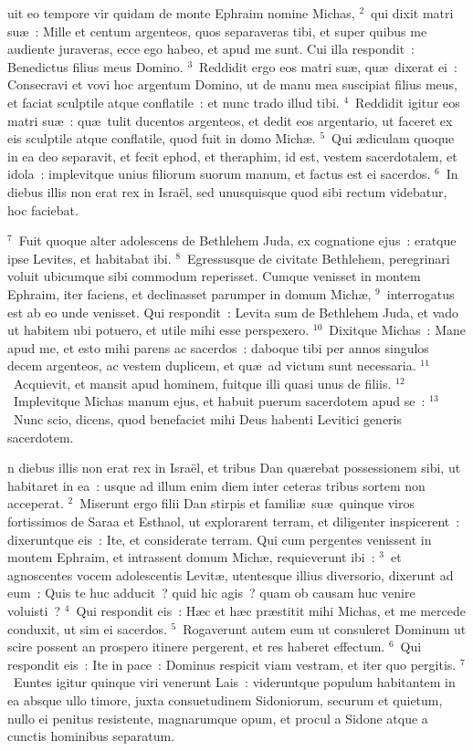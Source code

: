 \bchapter
{}uit eo tempore vir quidam de monte Ephraim nomine Michas,
${}^{2}$~qui dixit matri su\ae~: Mille et centum argenteos, quos separaveras tibi, et super quibus me audiente juraveras, ecce ego habeo, et apud me sunt. Cui illa respondit~: Benedictus filius meus Domino.
${}^{3}$~Reddidit ergo eos matri su\ae , qu\ae\ dixerat ei~: Consecravi et vovi hoc argentum Domino, ut de manu mea suscipiat filius meus, et faciat sculptile atque conflatile~: et nunc trado illud tibi.
${}^{4}$~Reddidit igitur eos matri su\ae~: qu\ae\ tulit ducentos argenteos, et dedit eos argentario, ut faceret ex eis sculptile atque conflatile, quod fuit in domo Mich\ae .
${}^{5}$~Qui \ae diculam quoque in ea deo separavit, et fecit ephod, et theraphim, id est, vestem sacerdotalem, et idola~: implevitque unius filiorum suorum manum, et factus est ei sacerdos.
${}^{6}$~In diebus illis non erat rex in Isra\"el, sed unusquisque quod sibi rectum videbatur, hoc faciebat.


${}^{7}$~Fuit quoque alter adolescens de Bethlehem Juda, ex cognatione ejus~: eratque ipse Levites, et habitabat ibi.
${}^{8}$~Egressusque de civitate Bethlehem, peregrinari voluit ubicumque sibi commodum reperisset. Cumque venisset in montem Ephraim, iter faciens, et declinasset parumper in domum Mich\ae ,
${}^{9}$~interrogatus est ab eo unde venisset. Qui respondit~: Levita sum de Bethlehem Juda, et vado ut habitem ubi potuero, et utile mihi esse perspexero.
${}^{10}$~Dixitque Michas~: Mane apud me, et esto mihi parens ac sacerdos~: daboque tibi per annos singulos decem argenteos, ac vestem duplicem, et qu\ae\ ad victum sunt necessaria.
${}^{11}$~Acquievit, et mansit apud hominem, fuitque illi quasi unus de filiis.
${}^{12}$~Implevitque Michas manum ejus, et habuit puerum sacerdotem apud se~:
${}^{13}$~Nunc scio, dicens, quod benefaciet mihi Deus habenti Levitici generis sacerdotem.

\bchapter
{}n diebus illis non erat rex in Isra\"el, et tribus Dan qu\ae rebat possessionem sibi, ut habitaret in ea~: usque ad illum enim diem inter ceteras tribus sortem non acceperat.
${}^{2}$~Miserunt ergo filii Dan stirpis et famili\ae\ su\ae\ quinque viros fortissimos de Saraa et Esthaol, ut explorarent terram, et diligenter inspicerent~: dixeruntque eis~: Ite, et considerate terram. Qui cum pergentes venissent in montem Ephraim, et intrassent domum Mich\ae , requieverunt ibi~:
${}^{3}$~et agnoscentes vocem adolescentis Levit\ae , utentesque illius diversorio, dixerunt ad eum~: Quis te huc adducit~? quid hic agis~? quam ob causam huc venire voluisti~?
${}^{4}$~Qui respondit eis~: H\ae c et h\ae c pr\ae stitit mihi Michas, et me mercede conduxit, ut sim ei sacerdos.
${}^{5}$~Rogaverunt autem eum ut consuleret Dominum ut scire possent an prospero itinere pergerent, et res haberet effectum.
${}^{6}$~Qui respondit eis~: Ite in pace~: Dominus respicit viam vestram, et iter quo pergitis.
${}^{7}$~Euntes igitur quinque viri venerunt Lais~: videruntque populum habitantem in ea absque ullo timore, juxta consuetudinem Sidoniorum, securum et quietum, nullo ei penitus resistente, magnarumque opum, et procul a Sidone atque a cunctis hominibus separatum.


